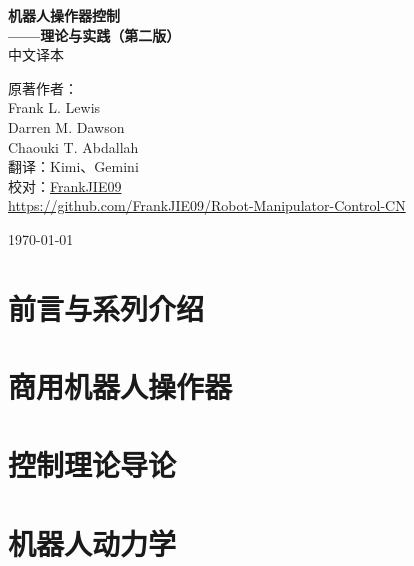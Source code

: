 \documentclass[UTF8,a4paper,12pt]{ctexbook}
\theoremstyle{definition}
\begin{document}
\begin{titlepage}
\begin{center}
\vspace*{3cm}

{\Huge\bfseries 机器人操作器控制}\\[1.5cm]
{\Large\bfseries ——理论与实践（第二版）}\\[2cm]
{\large 中文译本}\\[3cm]

\vfill

{\large 原著作者：}\\[0.5cm]
{\large Frank L. Lewis}\\
{\large Darren M. Dawson}\\
{\large Chaouki T. Abdallah}\\[1.5cm]

{\large 翻译：Kimi、Gemini}\\
{\large 校对：\href{https://github.com/FrankJIE09}{FrankJIE09}}\\
{\small\url{https://github.com/FrankJIE09/Robot-Manipulator-Control-CN}}\\[1.5cm]

\vfill

{\large \today}

\end{center}
\end{titlepage}

\frontmatter

\chapter*{前言与系列介绍}


\tableofcontents
\newpage

\mainmatter

\chapter{商用机器人操作器}


\chapter{控制理论导论}


\chapter{机器人动力学}

\end{document}
